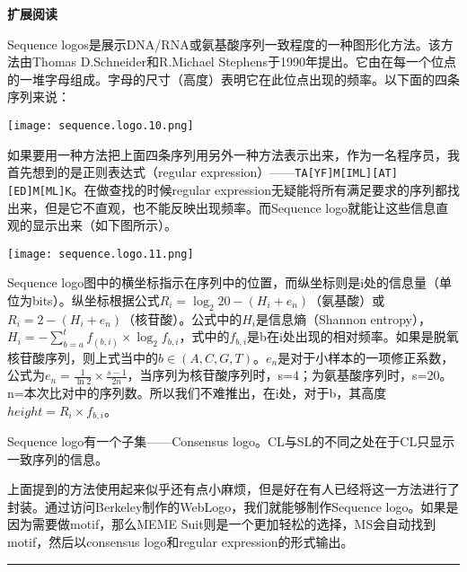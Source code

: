 \documentclass[11pt,a4paper,twoside]{book}
\begin{document}
\noindent
{\large \bfseries \HandPencilLeft 扩展阅读}

{\small
Sequence logos是展示DNA/RNA或氨基酸序列一致程度的一种图形化方法。该方法由Thomas D.Schneider和R.Michael Stephens于1990年提出。它由在每一个位点的一堆字母组成。字母的尺寸（高度）表明它在此位点出现的频率。以下面的四条序列来说：
\begin{center}
  \texttt{[image: sequence.logo.10.png]}
\end{center}

如果要用一种方法把上面四条序列用另外一种方法表示出来，作为一名程序员，我首先想到的是正则表达式（regular expression）——\verb|TA[YF]M[IML][AT][ED]M[ML]K|。在做查找的时候regular expression无疑能将所有满足要求的序列都找出来，但是它不直观，也不能反映出现频率。而Sequence logo就能让这些信息直观的显示出来（如下图所示）。
\begin{center}
  \texttt{[image: sequence.logo.11.png]}
\end{center}

Sequence logo图中的横坐标指示在序列中的位置，而纵坐标则是i处的信息量（单位为bits）。纵坐标根据公式$R_i = \log_2 20 - (H_i + e_n)$（氨基酸）或$R_i = 2 - (H_i + e_n)$（核苷酸）。公式中的$H_i$是信息熵（Shannon entropy），$H_i = -\sum_{b=a}^{t}f_{(b,i)} \times \log_2 f_{b,i}$，式中的$f_{b,i}$是b在i处出现的相对频率。如果是脱氧核苷酸序列，则上式当中的$b \in (A, C, G, T)$。$e_n$是对于小样本的一项修正系数，公式为$e_n = \frac{1}{\ln 2} \times \frac{s-1}{2n}$，当序列为核苷酸序列时，s=4；为氨基酸序列时，s=20。n=本次比对中的序列数。所以我们不难推出，在i处，对于b，其高度$height = R_i \times f_{b,i}$。

Sequence logo有一个子集——Consensus logo。CL与SL的不同之处在于CL只显示一致序列的信息。

上面提到的方法使用起来似乎还有点小麻烦，但是好在有人已经将这一方法进行了封装。通过访问Berkeley制作的WebLogo，我们就能够制作Sequence logo。如果是因为需要做motif，那么MEME Suit则是一个更加轻松的选择，MS会自动找到motif，然后以consensus logo和regular expression的形式输出。
}

\hrule height 3pt
\vspace{0.5cm}
\end{document}
